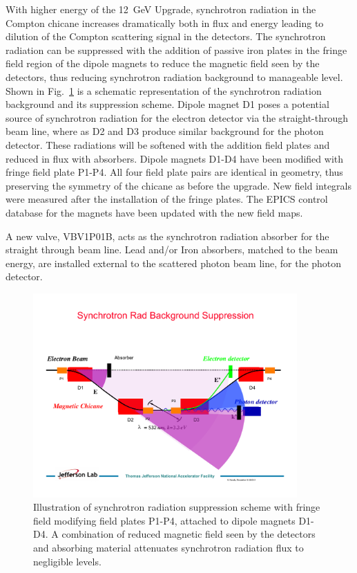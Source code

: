 With higher energy of the 12~GeV Upgrade, synchrotron radiation in the Compton chicane increases dramatically both in flux and energy leading to  dilution of the Compton scattering signal in the detectors. The synchrotron radiation can be suppressed with the  addition of  passive iron plates in the fringe field region of the dipole magnets to reduce the magnetic field seen by the  detectors, thus reducing synchrotron radiation background  to manageable level. Shown in Fig.~\ref{fig:compton_SRS} is a schematic representation of the synchrotron radiation background and its suppression scheme. Dipole magnet D1 poses a potential source of synchrotron radiation for the electron detector via  the straight-through beam line, where as D2 and D3 produce similar background for the photon detector.  These radiations  will be softened with the addition field plates and reduced in flux with absorbers. Dipole magnets D1-D4 have been modified with fringe field plate P1-P4. All four field plate pairs  are identical in geometry, thus preserving the symmetry of the chicane as before the upgrade.  New field integrals were measured after the installation of the fringe plates. The EPICS control database for the magnets have been updated with the new field maps.

A new valve, VBV1P01B, acts as the synchrotron radiation absorber for the straight through beam line. Lead and/or Iron absorbers, matched to the beam energy, are installed external to the scattered photon beam line, for the photon detector.
\begin{figure}[htp]
    \begin{center}
        \includegraphics*[angle=0,width=0.9\textwidth]{compton_SRS}
    \end{center}
\caption{ Illustration of synchrotron radiation suppression scheme with fringe field modifying field plates P1-P4, attached to dipole magnets D1-D4. A combination of reduced magnetic field seen by the  detectors and absorbing material attenuates synchrotron radiation flux to negligible  levels. }
    \label{fig:compton_SRS}
 \end{figure}

